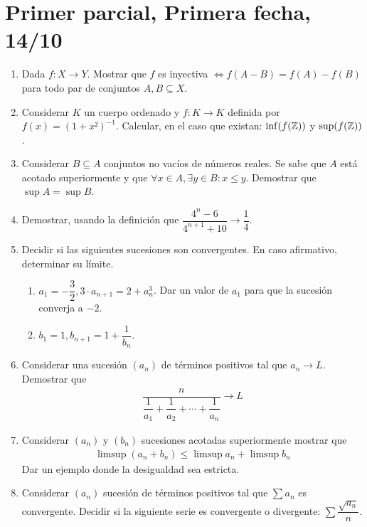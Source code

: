 \section{Primer parcial, Primera fecha, 14/10}

\begin{enumerate}
  \item Dada \(f: X \to Y\). Mostrar que \(f\) es inyectiva \(\iff f(A-B) = f(A) - f(B)\) para todo par de conjuntos \(A, B \subseteq X\).
  \item Considerar \(K\) un cuerpo ordenado y \(f: K \to K\) definida por \(f(x) = (1+x²)^{-1} \). Calcular, en el caso que existan: \( \inf(f(\mathbb{Z}))\) y \( \sup(f(\mathbb{Z}))\).
  \item Considerar \(B \subseteq A\) conjuntos no vacíos de números reales. Se sabe que \(A\) está acotado superiormente y que \(\forall x \in A, \exists y \in B : x \leq y\). Demostrar que \( \sup A = \sup B\).
  \item Demostrar, usando la definición que \(\dfrac{4^n - 6}{4^{n+1}+10} \to \dfrac{1}{4} \).
  \item Decidir si las siguientes sucesiones son convergentes. En caso afirmativo, determinar su límite. \begin{enumerate}
          \item \(a_1 = -\dfrac{3}{2}, 3 \cdot a_{n+1} = 2 + a_n^3\). Dar un valor de \(a_1\) para que la sucesión converja a \(-2\).
          \item \(b_1 = 1, b_{n+1} = 1 + \dfrac{1}{b_n} \).
        \end{enumerate}
  \item Considerar una sucesión \((a_n)\) de términos positivos tal que \(a_n \to L\). Demostrar que \begin{align*} \dfrac{n}{\dfrac{1}{a_1} + \dfrac{1}{a_2} + \cdots + \dfrac{1}{a_n}} \to L \end{align*}
  \item Considerar \((a_n)\) y \((b_n)\) sucesiones acotadas superiormente mostrar que \begin{align*} \limsup(a_n + b_n) \leq \limsup a_n + \limsup b_n \end{align*} Dar un ejemplo donde la desigualdad sea estricta.
  \item Considerar \((a_n)\) sucesión de términos positivos tal que \(\sum a_n\) es convergente. Decidir si la siguiente serie es convergente o divergente: \(\sum \dfrac{\sqrt{a_n}}{n} \).
\end{enumerate}

